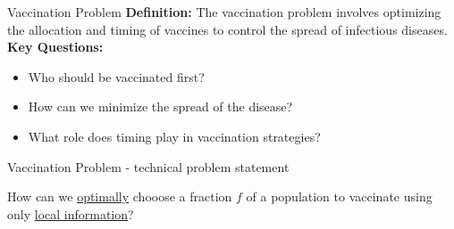 \documentclass{beamer}
\begin{document}
\begin{frame}{Vaccination Problem}
    \textbf{Definition:}
    The vaccination problem involves optimizing the allocation and timing of vaccines to control the spread of infectious diseases.\\
    \vspace{0.3cm} 
    \textbf{Key Questions:}
    \begin{itemize}
        \item Who should be vaccinated first?
        \item How can we minimize the spread of the disease?
        \item What role does timing play in vaccination strategies?
    \end{itemize}
\end{frame}

\begin{frame}[<+->]{Vaccination Problem - technical problem statement }
  \centering
  \begin{minipage}{0.6\textwidth}
    \large How can we \underline{optimally} chooose a fraction $f$ of a population to vaccinate using only \underline{local information}?
  \end{minipage}
\end{frame}
\end{document}

